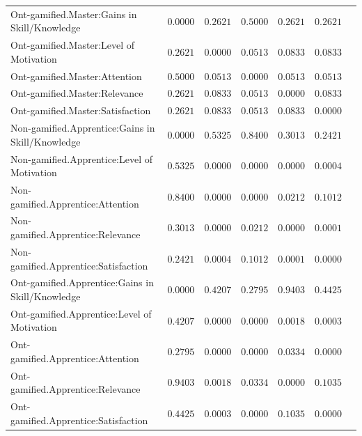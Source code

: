 \begin{landscape}
{\begin{longtable}{lrrrrrr}
Ont-gamified.Master:Gains in Skill/Knowledge&$0.0000$&$0.2621$&$0.5000$&$0.2621$&$0.2621$\tabularnewline
Ont-gamified.Master:Level of Motivation&$0.2621$&$0.0000$&$0.0513$&$0.0833$&$0.0833$\tabularnewline
Ont-gamified.Master:Attention&$0.5000$&$0.0513$&$0.0000$&$0.0513$&$0.0513$\tabularnewline
Ont-gamified.Master:Relevance&$0.2621$&$0.0833$&$0.0513$&$0.0000$&$0.0833$\tabularnewline
Ont-gamified.Master:Satisfaction&$0.2621$&$0.0833$&$0.0513$&$0.0833$&$0.0000$\tabularnewline
\hline


Non-gamified.Apprentice:Gains in Skill/Knowledge&$0.0000$&$0.5325$&$0.8400$&$0.3013$&$0.2421$\tabularnewline
Non-gamified.Apprentice:Level of Motivation&$0.5325$&$0.0000$&$0.0000$&$0.0000$&$0.0004$\tabularnewline
Non-gamified.Apprentice:Attention&$0.8400$&$0.0000$&$0.0000$&$0.0212$&$0.1012$\tabularnewline
Non-gamified.Apprentice:Relevance&$0.3013$&$0.0000$&$0.0212$&$0.0000$&$0.0001$\tabularnewline
Non-gamified.Apprentice:Satisfaction&$0.2421$&$0.0004$&$0.1012$&$0.0001$&$0.0000$\tabularnewline
\hline


Ont-gamified.Apprentice:Gains in Skill/Knowledge&$0.0000$&$0.4207$&$0.2795$&$0.9403$&$0.4425$\tabularnewline
Ont-gamified.Apprentice:Level of Motivation&$0.4207$&$0.0000$&$0.0000$&$0.0018$&$0.0003$\tabularnewline
Ont-gamified.Apprentice:Attention&$0.2795$&$0.0000$&$0.0000$&$0.0334$&$0.0000$\tabularnewline
Ont-gamified.Apprentice:Relevance&$0.9403$&$0.0018$&$0.0334$&$0.0000$&$0.1035$\tabularnewline
Ont-gamified.Apprentice:Satisfaction&$0.4425$&$0.0003$&$0.0000$&$0.1035$&$0.0000$\tabularnewline
\hline

\end{longtable}}\end{landscape}



